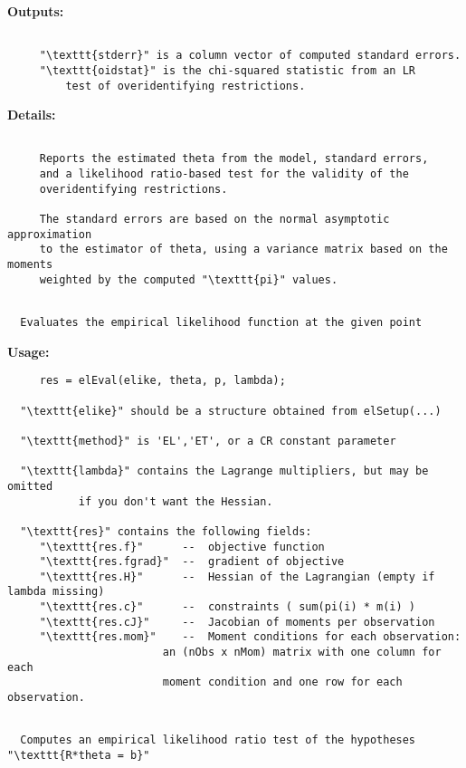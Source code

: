 {\small\textbf{Outputs:}}
\begin{lstlisting}
 
     "\texttt{stderr}" is a column vector of computed standard errors.
     "\texttt{oidstat}" is the chi-squared statistic from an LR
         test of overidentifying restrictions.
 \end{lstlisting}
{\small\textbf{Details:}}
\begin{lstlisting}
 
     Reports the estimated theta from the model, standard errors,
     and a likelihood ratio-based test for the validity of the
     overidentifying restrictions.
 
     The standard errors are based on the normal asymptotic approximation
     to the estimator of theta, using a variance matrix based on the moments
     weighted by the computed "\texttt{pi}" values.
 

\end{lstlisting}
\begin{lstlisting}
  Evaluates the empirical likelihood function at the given point
 \end{lstlisting}
{\small\textbf{Usage:}}
\begin{lstlisting}
     res = elEval(elike, theta, p, lambda);
 
  "\texttt{elike}" should be a structure obtained from elSetup(...)
 
  "\texttt{method}" is 'EL','ET', or a CR constant parameter
 
  "\texttt{lambda}" contains the Lagrange multipliers, but may be omitted
           if you don't want the Hessian.
 
  "\texttt{res}" contains the following fields:
     "\texttt{res.f}"      --  objective function
     "\texttt{res.fgrad}"  --  gradient of objective
     "\texttt{res.H}"      --  Hessian of the Lagrangian (empty if lambda missing)
     "\texttt{res.c}"      --  constraints ( sum(pi(i) * m(i) )
     "\texttt{res.cJ}"     --  Jacobian of moments per observation
     "\texttt{res.mom}"    --  Moment conditions for each observation:
                        an (nObs x nMom) matrix with one column for each
                        moment condition and one row for each observation.
 

\end{lstlisting}
\begin{lstlisting}
  Computes an empirical likelihood ratio test of the hypotheses "\texttt{R*theta = b}"
 \end{lstlisting}
